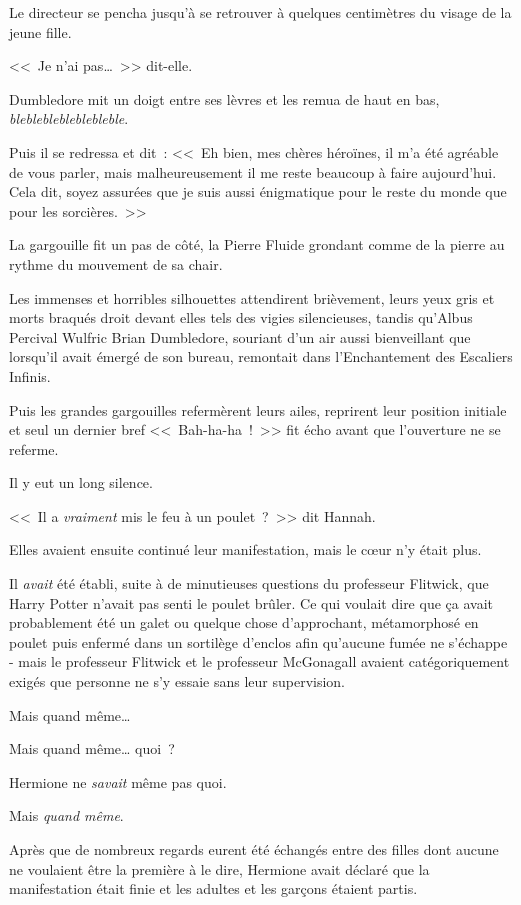 Le directeur se pencha jusqu'à se retrouver à quelques centimètres du visage de la jeune fille.

<<~Je n'ai pas…~>> dit-elle.

Dumbledore mit un doigt entre ses lèvres et les remua de haut en bas, \emph{blebleblebleblebleble}.

Puis il se redressa et dit~: <<~Eh bien, mes chères héroïnes, il m'a été agréable de vous parler, mais malheureusement il me reste beaucoup à faire aujourd'hui. Cela dit, soyez assurées que je suis aussi énigmatique pour le reste du monde que pour les sorcières.~>>

La gargouille fit un pas de côté, la Pierre Fluide grondant comme de la pierre au rythme du mouvement de sa chair.

Les immenses et horribles silhouettes attendirent brièvement, leurs yeux gris et morts braqués droit devant elles tels des vigies silencieuses, tandis qu'Albus Percival Wulfric Brian Dumbledore, souriant d'un air aussi bienveillant que lorsqu'il avait émergé de son bureau, remontait dans l'Enchantement des Escaliers Infinis.

Puis les grandes gargouilles refermèrent leurs ailes, reprirent leur position initiale et seul un dernier bref <<~Bah-ha-ha~!~>> fit écho avant que l'ouverture ne se referme.

Il y eut un long silence.

<<~Il a \emph{vraiment} mis le feu à un poulet~?~>> dit Hannah.

\later

Elles avaient ensuite continué leur manifestation, mais le cœur n'y était plus.

Il \emph{avait} été établi, suite à de minutieuses questions du professeur Flitwick, que Harry Potter n'avait pas senti le poulet brûler. Ce qui voulait dire que ça avait probablement été un galet ou quelque chose d'approchant, métamorphosé en poulet puis enfermé dans un sortilège d'enclos afin qu'aucune fumée ne s'échappe - mais le professeur Flitwick et le professeur McGonagall avaient catégoriquement exigés que personne ne s'y essaie sans leur supervision.

Mais quand même…

Mais quand même… quoi~?

Hermione ne \emph{savait} même pas quoi.

Mais \emph{quand même}.

Après que de nombreux regards eurent été échangés entre des filles dont aucune ne voulaient être la première à le dire, Hermione avait déclaré que la manifestation était finie et les adultes et les garçons étaient partis.


